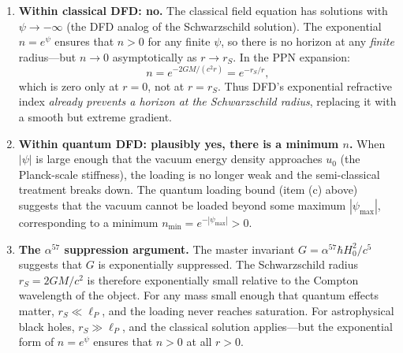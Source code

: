 \documentclass[11pt,a4paper]{article}
\begin{document}
\begin{enumerate}
\item \textbf{Within classical DFD: no.}  The classical field equation has
solutions with $\psi \to -\infty$ (the DFD analog of the Schwarzschild
solution).  The exponential $n = e^\psi$ ensures that $n > 0$ for any
finite $\psi$, so there is no horizon at any \emph{finite} radius---but
$n \to 0$ asymptotically as $r \to r_S$.  In the PPN expansion:
\begin{equation}
n = e^{-2GM/(c^2 r)} = e^{-r_S/r},
\end{equation}
which is zero only at $r = 0$, not at $r = r_S$.  Thus DFD's exponential
refractive index \emph{already prevents a horizon at the Schwarzschild
radius}, replacing it with a smooth but extreme gradient.

\item \textbf{Within quantum DFD: plausibly yes, there is a minimum $n$.}
When $|\psi|$ is large enough that the vacuum energy density approaches
$u_0$ (the Planck-scale stiffness), the loading is no longer weak and
the semi-classical treatment breaks down.  The quantum loading bound
(item (c) above) suggests that the vacuum cannot be loaded beyond some
maximum $|\psi_{\max}|$, corresponding to a minimum
$n_{\min} = e^{-|\psi_{\max}|} > 0$.

\item \textbf{The $\alpha^{57}$ suppression argument.}  The master
invariant $G = \alpha^{57}\hbar H_0^2/c^5$ suggests that $G$ is
exponentially suppressed.  The Schwarzschild radius
$r_S = 2GM/c^2$ is therefore exponentially small relative to the
Compton wavelength of the object.  For any mass small enough that
quantum effects matter, $r_S \ll \ell_P$, and the loading never
reaches saturation.  For astrophysical black holes, $r_S \gg \ell_P$,
and the classical solution applies---but the exponential form of
$n = e^\psi$ ensures that $n > 0$ at all $r > 0$.
\end{enumerate}
\end{document}

